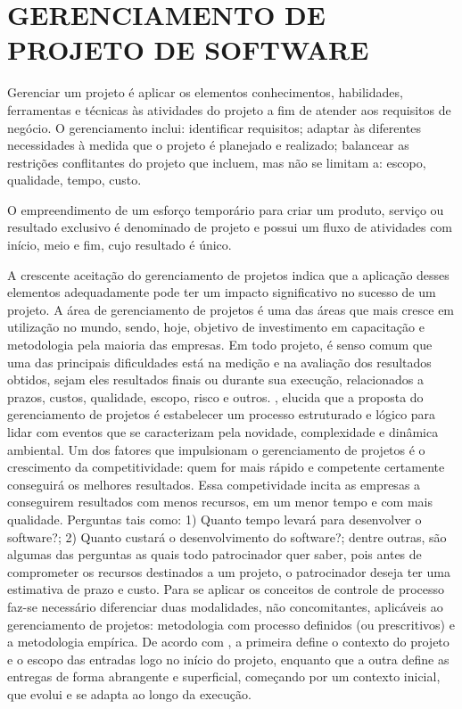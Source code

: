 \chapter*[GERENCIAMENTO DE PROJETO DE SOFTWARE]{GERENCIAMENTO DE PROJETO DE SOFTWARE}

Gerenciar um projeto é aplicar os elementos conhecimentos, habilidades, ferramentas e técnicas às atividades do projeto a fim de atender aos requisitos de negócio. O gerenciamento inclui: identificar requisitos; adaptar às diferentes necessidades à medida que o projeto é planejado e realizado; balancear as restrições conflitantes do projeto que incluem, mas não se limitam a: escopo, qualidade, tempo, custo. \cite{ansi1998}

O empreendimento de um esforço temporário para criar um produto, serviço ou resultado exclusivo é denominado de projeto e possui um fluxo de atividades com início, meio e fim, cujo resultado é único. \cite{pmbok}

A crescente aceitação do gerenciamento de projetos indica que a aplicação desses elementos adequadamente pode ter um impacto significativo no sucesso de um projeto. \cite{pmbok}
A área de gerenciamento de projetos é uma das áreas que mais cresce em utilização no mundo, sendo, hoje, objetivo de investimento em capacitação e metodologia pela maioria das empresas. Em todo projeto, é senso comum que uma das principais dificuldades está na medição e na avaliação dos resultados obtidos, sejam eles resultados finais ou durante sua execução, relacionados a prazos, custos, qualidade, escopo, risco e outros. \cite{vargas2011} \cite{vargas2009}, elucida que a proposta do gerenciamento de projetos é estabelecer um processo estruturado e lógico para lidar com eventos que se caracterizam pela novidade, complexidade e dinâmica ambiental. Um dos fatores que impulsionam o gerenciamento de projetos é o crescimento da competitividade: quem for mais rápido e competente certamente conseguirá os melhores resultados. Essa competividade incita as empresas a conseguirem resultados com menos recursos, em um menor tempo e com mais qualidade.
Perguntas tais como: 1) Quanto tempo levará para desenvolver o software?; 2) Quanto custará o desenvolvimento do software?; dentre outras, são algumas das perguntas as quais todo patrocinador quer saber, pois antes de comprometer os recursos destinados a um projeto, o patrocinador deseja ter uma estimativa de prazo e custo. \cite{pfleeger2004}
Para se aplicar os conceitos de controle de processo faz-se necessário diferenciar duas modalidades, não concomitantes, aplicáveis ao gerenciamento de projetos: metodologia com processo definidos (ou prescritivos) e a metodologia empírica. De acordo com \cite{martins2007}, a primeira define o contexto do projeto e o escopo das entradas logo no início do projeto, enquanto que a outra define as entregas de forma abrangente e superficial, começando por um contexto inicial, que evolui e se adapta ao longo da execução.

